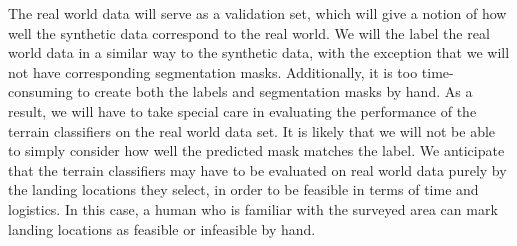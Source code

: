 The real world data will serve as a validation set, which will give a notion of how well
the synthetic data correspond to the real world.
We will the label the real world data in a similar way to the synthetic data, with the exception
that we will not have corresponding segmentation masks.
Additionally, it is too time-consuming to create both the labels
and segmentation masks by hand.
As a result, we will have to take special care in evaluating the performance of the terrain
classifiers on the real world data set.
It is likely that we will not be able to simply consider how well the predicted mask
matches the label.
We anticipate that the terrain classifiers may have to be evaluated on real world data purely by
the landing locations they select, in order to be feasible in terms of time and logistics.
In this case, a human who is familiar with the surveyed area can mark landing locations
as feasible or infeasible by hand.